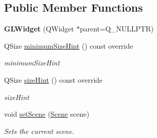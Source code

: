 \subsection*{Public Member Functions}
\begin{DoxyCompactItemize}
\item 
\mbox{\label{class_g_l_widget_a39ef1736aef8b1c6e2f7cff20b7a3997}} 
{\bfseries G\+L\+Widget} (Q\+Widget $\ast$parent=Q\+\_\+\+N\+U\+L\+L\+P\+TR)
\item 
Q\+Size \mbox{\hyperlink{class_g_l_widget_a1e50c746ef5d95c14de5907be6239dd1}{minimum\+Size\+Hint}} () const override
\begin{DoxyCompactList}\small\item\em minimum\+Size\+Hint \end{DoxyCompactList}\item 
Q\+Size \mbox{\hyperlink{class_g_l_widget_af04a97931fb78d610e1c73d7c4887319}{size\+Hint}} () const override
\begin{DoxyCompactList}\small\item\em size\+Hint \end{DoxyCompactList}\item 
void \mbox{\hyperlink{class_g_l_widget_ae31adda78d396b83f0891b8cde79a6cf}{set\+Scene}} (\mbox{\hyperlink{class_scene}{Scene}} scene)
\begin{DoxyCompactList}\small\item\em Sets the current scene. \end{DoxyCompactList}\end{DoxyCompactItemize}
